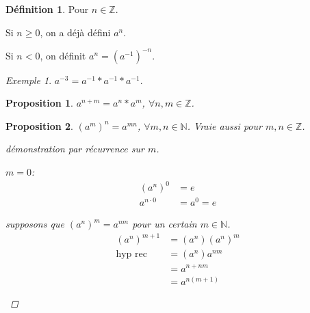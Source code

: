 \documentclass{report}
\newcommand*{\entiers}{\mathbb{Z}}
\newcommand*{\naturels}{\mathbb{N}}
\newtheorem*{prop}{Proposition}
\theoremstyle{definition}
\newtheorem*{defin}{D\'efinition}
\theoremstyle{remark}
\newtheorem*{exem}{Exemple}
\begin{document}
	\begin{defin}
		Pour $n \in \entiers$.

		Si $n \geq 0$, on a d\'ej\`a d\'efini $a^n$.

		Si $n<0$, on d\'efinit $a^n=(a^{-1})^{-n}$.
	\end{defin}
	\begin{exem}
		$a^{-3}=a^{-1}*a^{-1}*a^{-1}$.
	\end{exem}
	\begin{prop}
		$a^{n+m}=a^n*a^m$, $\forall n,m \in \entiers$.
	\end{prop}
	\begin{prop}
		$(a^m)^n=a^{mn}$, $\forall m,n \in \naturels$. Vraie aussi pour $m,n \in \entiers$.
		\begin{proof}[d\'emonstration par r\'ecurrence sur $m$]~

		\begin{nlist}
			\item $m=0$:
			\begin{align*}
				(a^n)^0&= e\\
				a^{n \cdot 0}&= a^0=e
			\end{align*}
			\item supposons que $(a^n)^m=a^{nm}$ pour un certain $m \in \naturels$.
			\begin{align*}
				(a^n)^{m+1}&= (a^n)(a^n)^m\\
				\text{hyp rec}&= (a^n)a^{nm}\\
				&= a^{n+nm}\\
				&= a^{n(m+1)}
			\end{align*}
		\end{nlist}
		\end{proof}
	\end{prop}
\end{document}
